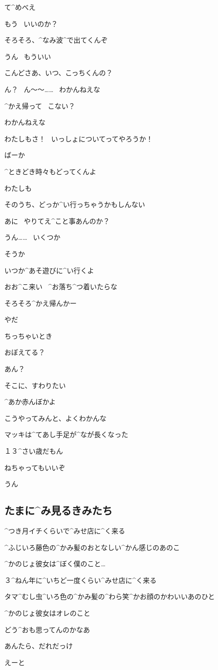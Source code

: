 \Takahiro て^{め}{べ}え

\page[157]
\Takahiro もう
\ いいのか？

\Takahiro そろそろ、^{なみ}{波}^{で}{出}てくんぞ

\Makki うん
\ もういい

\Makki こんどさあ、いつ、こっちくんの？

\Takahiro ん？
\ ん〜〜……
\ わかんねえな

\page[158]
\Makki ^{かえ}{帰}って
\ こない？

\Takahiro わかんねえな

\Makki わたしもさ！
\ いっしょについてってやろうか！

\Takahiro ばーか

\Takahiro ^{ときどき}{時々}もどってくんよ

\page[159]
\Makki わたしも

\Makki そのうち、どっか^{い}{行}っちゃうかもしんない

\Takahiro あに
\ やりてえ^{こと}{事}あんのか？

\Makki うん……
\ いくつか

\Takahiro そうか

\Makki いつか^{あそ}{遊}びに^{い}{行}くよ

\Takahiro おお^{こ}{来}い
\ ^{お}{落}ち^{つ}{着}いたらな

\page[160]
\Takahiro そろそろ^{かえ}{帰}んかー

\Makki やだ

\page[161]
\Makki ちっちゃいとき

\Makki おぼえてる？

\Takahiro あん？

\Makki そこに、すわりたい

\Takahiro ^{あか}{赤}んぼかよ

\page[162]
\Takahiro こうやってみんと、よくわかんな

\Takahiro マッキは^{てあし}{手足}が^{なが}{長}くなった

\Makki １３^{さい}{歳}だもん

\page[163]
\Takahiro ねちゃってもいいぞ

\Makki うん


\subsection{たまに^{み}{見}るきみたち}
\Person ^{つき}{月}イチくらいで^{みせ}{店}に^{く}{来}る

\Person ^{ふじいろ}{藤色}の^{かみ}{髪}のおとなしい^{かん}{感}じのあのこ

\Person ^{かのじょ}{彼女}は^{ぼく}{僕}のこと…

\Person ３^{ねん}{年}に^{いちど}{一度}くらい^{みせ}{店}に^{く}{来}る

\Person タマ^{むし}{虫}^{いろ}{色}の^{かみ}{髪}の^{わら}{笑}^{かお}{顔}のかわいいあのひと

\Person ^{かのじょ}{彼女}はオレのこと

\Person どう^{おも}{思}ってんのかなあ

\Shiba あんたら、だれだっけ

\Shiba えーと
